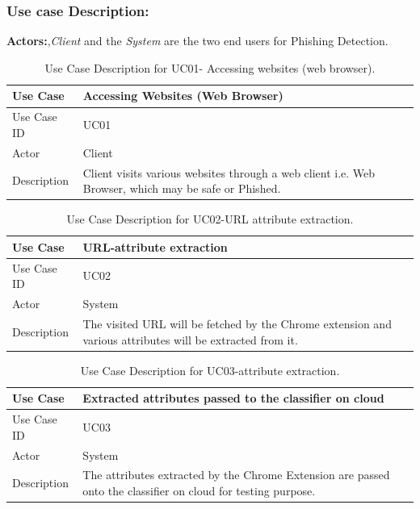 \documentclass[12pt]{article}
\begin{document}
\subsubsection*{Use case Description:}
\textbf{Actors:},\textit{Client} and the \textit{System} are the two end users for Phishing Detection.

\begin{table}[h]
\caption{Use Case Description for UC01- Accessing websites (web browser).}
\centering
\begin{tabular}{|p{3cm}|p{10cm}|}
\hline
    Use Case & Accessing Websites (Web Browser)  \\
    \hline
    Use Case ID & UC01 \\
    \hline
    Actor & Client \\
    \hline
    Description & Client visits various websites through a web client i.e. Web Browser, which may be safe or Phished. \\
    \hline
\end{tabular}
\end{table}

\begin{table}[h]
\caption{Use Case Description for UC02-URL attribute extraction.}
\centering
\begin{tabular}{|p{3cm}|p{10cm}|}
\hline
    Use Case & URL-attribute extraction  \\
    \hline
    Use Case ID & UC02 \\
    \hline
    Actor & System \\
    \hline
    Description & The visited URL will be fetched by the Chrome extension and various attributes will be extracted from it. \\
    \hline
\end{tabular}
\end{table}

\begin{table}[h]
\caption{Use Case Description for UC03-attribute extraction.}
\centering
\begin{tabular}{|p{3cm}|p{10cm}|}
\hline
    Use Case & Extracted attributes passed to the classifier on cloud \\
    \hline
    Use Case ID & UC03 \\
    \hline
    Actor & System \\
    \hline
    Description & The attributes extracted by the Chrome Extension are passed onto the classifier on cloud for testing purpose. \\
    \hline
\end{tabular}
\end{table}
\end{document}
